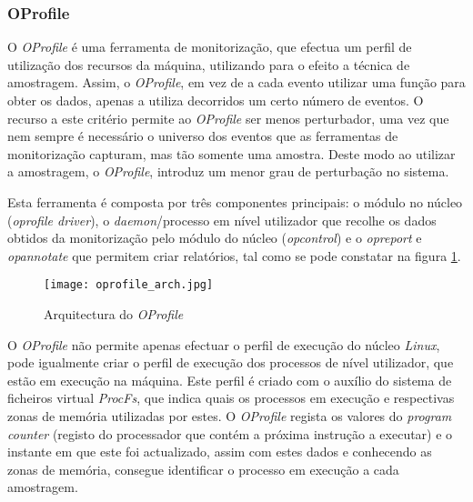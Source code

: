 \subsubsection{OProfile}\label{cap:Oprofile_overview}
O \textit{OProfile} é uma ferramenta de monitorização, que efectua um perfil de utilização dos recursos da máquina, utilizando para o efeito a técnica de amostragem.
Assim, o \textit{OProfile}, em vez de a cada evento utilizar uma função para obter os dados, apenas a utiliza decorridos um certo número de eventos.
O recurso a este critério permite ao \textit{OProfile} ser menos perturbador, uma vez que nem sempre é necessário o universo dos eventos que as ferramentas de monitorização capturam, mas tão somente uma amostra.
Deste modo ao utilizar a amostragem, o \textit{OProfile}, introduz um menor grau de perturbação no sistema\cite{Will:TuninProgrOProf}.

Esta ferramenta é composta por três componentes principais: o módulo no núcleo (\textit{oprofile driver}), o \textit{daemon}/processo em nível utilizador que recolhe os dados obtidos da monitorização pelo módulo do núcleo (\textit{opcontrol}) e o \textit{opreport} e \textit{opannotate} que permitem criar relatórios, tal como se pode constatar na figura \ref{fig:oprofile_arch}.

\begin{figure}[!htb]
       \centering
       \texttt{[image: oprofile\_arch.jpg]}
       \caption{Arquitectura do \textit{OProfile} \cite{Will:TuninProgrOProf}}
	\label{fig:oprofile_arch}
\end{figure}

O \textit{OProfile} não permite apenas efectuar o perfil de execução do núcleo \textit{Linux}, pode igualmente criar o perfil de execução dos processos de nível utilizador, que estão em execução na máquina.
Este perfil é criado com o auxílio do sistema de ficheiros virtual \textit{ProcFs}, que indica quais os processos em execução e respectivas zonas de memória utilizadas por estes.
O \textit{OProfile} regista os valores do \textit{program counter} (registo do processador que contém a próxima instrução a executar) e o instante em que este foi actualizado, assim com estes dados e conhecendo as zonas de memória, consegue identificar o processo em execução a cada amostragem.


